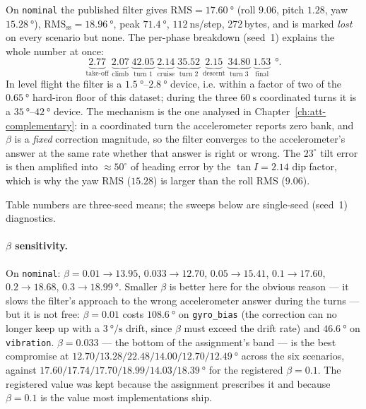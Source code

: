 On \texttt{nominal} the published filter gives $\text{RMS}=\SI{17.60}{\degree}$
(roll $9.06$, pitch $1.28$, yaw $\SI{15.28}{\degree}$), $\text{RMS}_{\text{ss}}=\SI{18.96}{\degree}$,
peak $\SI{71.4}{\degree}$, $\SI{112}{\nano\second}$/step, 272\,bytes, and is marked \emph{lost} on
every scenario but none. The per-phase breakdown (seed~1) explains the whole number at once:
\[
\underbrace{2.77}_{\text{take-off}}\;
\underbrace{2.07}_{\text{climb}}\;
\underbrace{\mathbf{42.05}}_{\text{turn 1}}\;
\underbrace{2.14}_{\text{cruise}}\;
\underbrace{\mathbf{35.52}}_{\text{turn 2}}\;
\underbrace{2.15}_{\text{descent}}\;
\underbrace{\mathbf{34.80}}_{\text{turn 3}}\;
\underbrace{1.53}_{\text{final}}\ \SI{}{\degree}.
\]
In level flight the filter is a $\SI{1.5}{\degree}$--$\SI{2.8}{\degree}$ device, i.e. within a
factor of two of the $\SI{0.65}{\degree}$ hard-iron floor of this dataset; during the three
$\SI{60}{\second}$ coordinated turns it is a $\SI{35}{\degree}$--$\SI{42}{\degree}$ device. The
mechanism is the one analysed in Chapter~\ref{ch:att-complementary}: in a coordinated turn the
accelerometer reports zero bank, and $\beta$ is a \emph{fixed} correction magnitude, so the filter
converges to the accelerometer's answer at the same rate whether that answer is right or wrong. The
$23^\circ$ tilt error is then amplified into $\approx\!50^\circ$ of heading error by the
$\tan I=2.14$ dip factor, which is why the yaw RMS ($15.28$) is larger than the roll RMS ($9.06$).

Table numbers are three-seed means; the sweeps below are single-seed (seed~1) diagnostics.

\paragraph{$\beta$ sensitivity.} On \texttt{nominal}:
$\beta=0.01\to13.95$, $0.033\to12.70$, $0.05\to15.41$, $0.1\to17.60$, $0.2\to18.68$,
$0.3\to\SI{18.99}{\degree}$. Smaller $\beta$ is better here for the obvious reason --- it slows the
filter's approach to the wrong accelerometer answer during the turns --- but it is not free:
$\beta=0.01$ costs $\SI{108.6}{\degree}$ on \texttt{gyro\_bias} (the correction can no longer keep
up with a $\SI{3}{\degree\per\second}$ drift, since $\beta$ must exceed the drift rate) and
$\SI{46.6}{\degree}$ on \texttt{vibration}. $\beta=0.033$ --- the bottom of the assignment's band ---
is the best compromise at $12.70/13.28/22.48/14.00/12.70/\SI{12.49}{\degree}$ across the six
scenarios, against $17.60/17.74/17.70/18.99/14.03/\SI{18.39}{\degree}$ for the registered
$\beta=0.1$. The registered value was kept because the assignment prescribes it and because
$\beta=0.1$ is the value most implementations ship.

